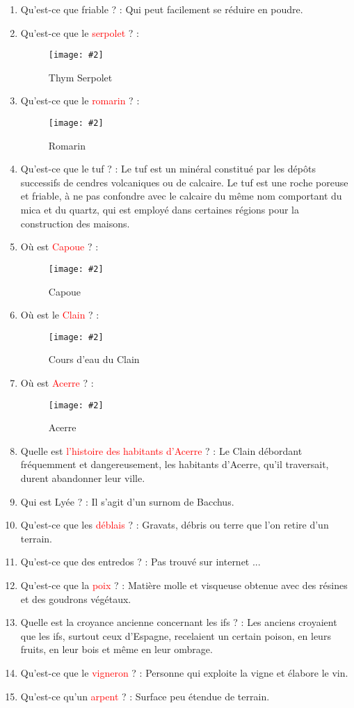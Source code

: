 \documentclass[a4paper, 11pt, hidelinks]{article}
\newcommand{\img}[4]{\begin{figure}[!ht]
    \centering
    \texttt{[image: \#2]}
    \caption{#3}
    \label{#4}
    \end{figure} }
\begin{document}
\begin{enumerate}
      \item Qu'est-ce que friable ? : Qui peut facilement se réduire en poudre.
      \item Qu'est-ce que le \textcolor{red}{serpolet} ? :
            \img{0.5}{Serpolet.jpg}{Thym Serpolet}{89}
      \item Qu'est-ce que le \textcolor{red}{romarin} ? :
            \img{0.5}{Romarin.jpg}{Romarin}{90}
      \item Qu'est-ce que le tuf ? : Le tuf est un minéral constitué par les dépôts successifs de cendres volcaniques ou de
            calcaire. Le tuf est une roche poreuse et friable, à ne pas confondre avec le calcaire du même nom comportant du mica
            et du quartz, qui est employé dans certaines régions pour la construction des maisons.
      \item Où est \textcolor{red}{Capoue} ? :
            \img{0.5}{Capoue.png}{Capoue}{91}
      \item Où est le \textcolor{red}{Clain} ? :
            \img{0.4}{Clain.png}{Cours d'eau du Clain}{92}
      \item Où est \textcolor{red}{Acerre} ? :
            \img{0.4}{Acerre.png}{Acerre}{93}
      \item Quelle est \textcolor{red}{l'histoire des habitants d'Acerre} ? : Le Clain débordant fréquemment et dangereusement, les habitants d'Acerre,
            qu'il traversait, durent abandonner leur ville.
      \item Qui est Lyée ? : Il s'agit d'un surnom de Bacchus.
      \item Qu'est-ce que les \textcolor{red}{déblais} ? : Gravats, débris ou terre que l'on retire d'un terrain.
      \item Qu'est-ce que des entredos ? : Pas trouvé sur internet ...
      \item Qu'est-ce que la \textcolor{red}{poix} ? : Matière molle et visqueuse obtenue avec des résines et des goudrons végétaux.
      \item Quelle est la croyance ancienne concernant les ifs ? : Les anciens croyaient que les ifs, surtout ceux d'Espagne, recelaient
            un certain poison, en leurs fruits, en leur bois et même en leur ombrage.
      \item Qu'est-ce que le \textcolor{red}{vigneron} ? : Personne qui exploite la vigne et élabore le vin.
      \item Qu'est-ce qu'un \textcolor{red}{arpent} ? : Surface peu étendue de terrain.

\end{enumerate}
\end{document}
